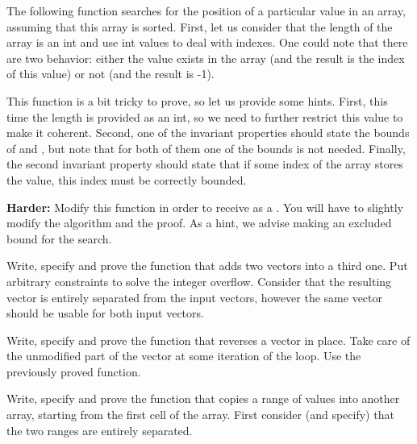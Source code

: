 

\label{l4:statements-loops-ex-bsearch}


The following function searches for the position of a particular value in an
array, assuming that this array is sorted. First, let us consider that the
length of the array is an int and use int values to deal with indexes. One
could note that there are two behavior: either the value exists in the array
(and the result is the index of this value) or not (and the result is -1).




This function is a bit tricky to prove, so let us provide some hints. First,
this time the length is provided as an int, so we need to further restrict
this value to make it coherent. Second, one of the invariant properties
should state the bounds of  and , but note
that for both of them one of the bounds is not needed. Finally, the second
invariant property should state that if some index of the array stores the
value, this index must be correctly bounded.


\textbf{Harder:} Modify this function in order to receive 
as a . You will have to slightly modify the algorithm
and the proof. As a hint, we advise making  an excluded
bound for the search.




Write, specify and prove the function that adds two vectors into a third
one. Put arbitrary constraints to solve the integer overflow. Consider that
the resulting vector is entirely separated from the input vectors, however
the same vector should be usable for both input vectors.






Write, specify and prove the function that reverses a vector in place. Take
care of the unmodified part of the vector at some iteration of the loop.
Use the previously proved  function.






Write, specify and prove the function  that copies a range
of values into another array, starting from the first cell of the array.
First consider (and specify) that the two ranges are entirely separated.


